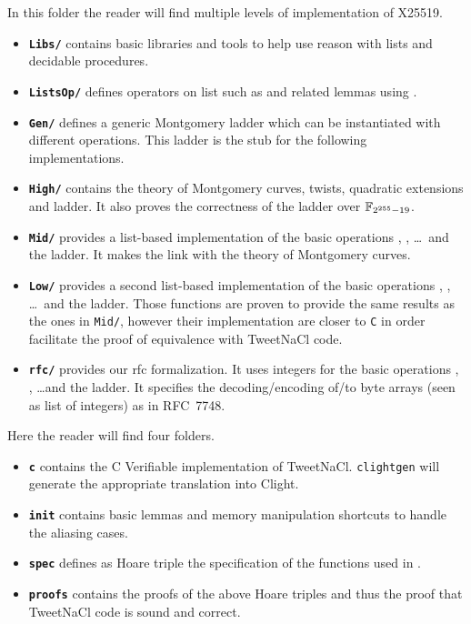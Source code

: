 In this folder the reader will find multiple levels of implementation of X25519.
\begin{itemize}
  \item \textbf{\texttt{Libs/}} contains basic libraries and tools to help use
        reason with lists and decidable procedures.
  \item \textbf{\texttt{ListsOp/}} defines operators on list such as
         and related lemmas using \eg {}.
  \item \textbf{\texttt{Gen/}} defines a generic Montgomery ladder which can be
        instantiated with different operations. This ladder is the stub for the
        following implementations.
  \item \textbf{\texttt{High/}} contains the theory of Montgomery curves,
        twists, quadratic extensions and ladder.
        It also proves the correctness of the ladder over $\mathbb{F}_{2^{255}-19}$.
  \item \textbf{\texttt{Mid/}} provides a list-based implementation of the
        basic operations , ,  \ldots~and the ladder. It
        makes the link with the theory of Montgomery curves.
  \item \textbf{\texttt{Low/}} provides a second list-based implementation of
        the basic operations , ,  \ldots~and the ladder.
        Those functions are proven to provide the same results as the ones in
        \texttt{Mid/}, however their implementation are closer to \texttt{C} in order
        facilitate the proof of equivalence with TweetNaCl code.
  \item \textbf{\texttt{rfc/}} provides our rfc formalization.
        It uses integers for the basic operations , , 
        \ldots and the ladder. It specifies the decoding/encoding of/to byte
        arrays (seen as list of integers) as in RFC~7748.
\end{itemize}

Here the reader will find four folders.
\begin{itemize}
  \item \textbf{\texttt{c}} contains the C Verifiable implementation of TweetNaCl.
        \texttt{clightgen} will generate the appropriate translation into Clight.
  \item \textbf{\texttt{init}} contains basic lemmas and memory manipulation
        shortcuts to handle the aliasing cases.
  \item \textbf{\texttt{spec}} defines as Hoare triple the specification of the
        functions used in .
  \item \textbf{\texttt{proofs}} contains the proofs of the above Hoare triples
        and thus the proof that TweetNaCl code is sound and correct.
\end{itemize}
